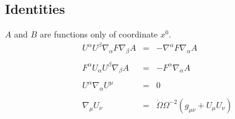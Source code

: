 \documentclass[10pt,letterpaper]{article}
\numberwithin{equation}{section}
\begin{document}
\subsection{Identities}
$A$ and $B$ are functions only of coordinate $x^0$. 
\begin{eqnarray}
U^\alpha U^\beta \nabla_\alpha F\nabla_\beta A &=& -\nabla^\alpha F \nabla_\alpha A
\\ \nonumber\\
F^\alpha U_\alpha U^\beta \nabla_\beta A &=& -F^\alpha \nabla_\alpha A
\\ \nonumber\\
U^\alpha\nabla_\alpha U^\mu &=& 0
\\ \nonumber\\
\nabla_\mu U_\nu &=& \dot\Omega \Omega^{-2}(g_{\mu\nu} + U_{\mu}U_\nu)
\end{eqnarray}
%
%
\end{document}
